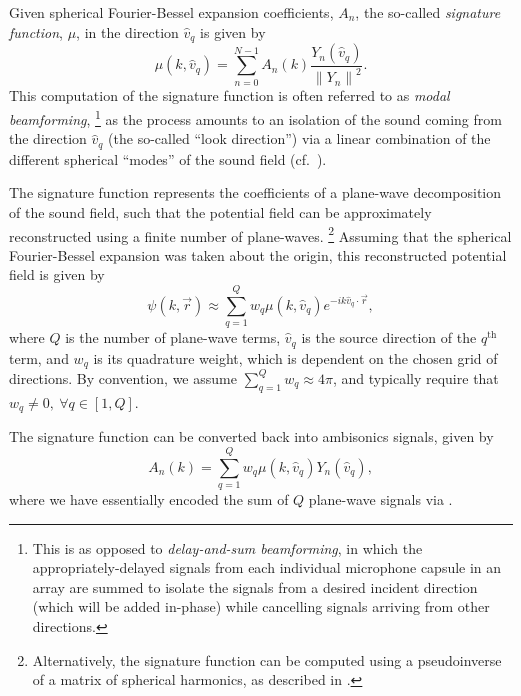 Given spherical Fourier-Bessel expansion coefficients, $A_n$, the so-called \textit{signature function}, $\mu$, in the direction $\hat{v}_q$ is given by~\citep[section~2.3.3]{GumerovDuraiswami2005}
\begin{equation}\label{eq:02_Acoustical_Theory:A2mu}
\mu(k,\hat{v}_q) = \sum_{n=0}^{N-1} A_n(k) \frac{Y_n(\hat{v}_q)}{\left\|Y_n\right\|^2}.
\end{equation}
This computation of the signature function is often referred to as \textit{modal beamforming},%
\footnote{This is as opposed to \textit{delay-and-sum beamforming}, in which the appropriately-delayed signals from each individual microphone capsule in an array are summed to isolate the signals from a desired incident direction (which will be added in-phase) while cancelling signals arriving from other directions.}
as the process amounts to an isolation of the sound coming from the direction $\hat{v}_q$ (the so-called ``look direction'') via a linear combination of the different spherical ``modes'' of the sound field (cf.~\citet{HahnSpors2015b,Spors2012}).

The signature function represents the coefficients of a plane-wave decomposition of the sound field, such that the potential field can be approximately reconstructed using a finite number of plane-waves.%
\footnote{Alternatively, the signature function can be computed using a pseudoinverse of a matrix of spherical harmonics, as described in .}
Assuming that the spherical Fourier-Bessel expansion was taken about the origin, this reconstructed potential field is given by
\begin{equation}\label{eq:02_Acoustical_Theory:PW_Quadrature_Rendered_Field}
\psi(k,\vec{r}) \approx \sum_{q=1}^Q w_q \mu(k,\hat{v}_q) e^{-i k \hat{v}_q \cdot \vec{r}},
\end{equation}
where $Q$ is the number of plane-wave terms, $\hat{v}_q$ is the source direction of the $q^\text{th}$ term, and $w_q$ is its quadrature weight, which is dependent on the chosen grid of directions.
By convention, we assume $\sum_{q=1}^Q w_q \approx 4 \pi$, and typically require that $w_q \neq 0,~\forall q \in [1, Q]$.

The signature function can be converted back into ambisonics signals, given by
\begin{equation}\label{eq:02_Acoustical_Theory:mu2A_Quadrature}
A_n(k) = \sum_{q=1}^{Q} w_q \mu(k,\hat{v}_q) Y_{n}(\hat{v}_q),
\end{equation}
where we have essentially encoded the sum of $Q$ plane-wave signals via .